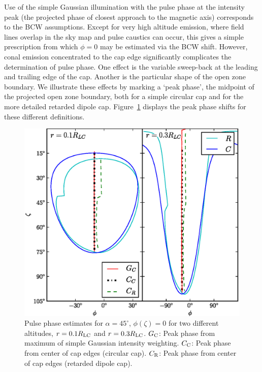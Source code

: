 	Use of the simple Gaussian illumination with the pulse phase at the
intensity peak (the projected phase of closest approach to the magnetic axis)
corresponds to the BCW assumptions. Except for very high altitude emission, where
field lines overlap in the sky map and pulse caustics can occur, this gives
a simple prescription from which $\phi=0$ may be estimated via the BCW shift. 
However, conal emission concentrated to the cap edge significantly complicates
the determination of pulse phase. One effect is the variable sweep-back at the
leading and trailing edge of the cap. Another is the particular shape of the open
zone boundary. We illustrate these effects by marking a `peak phase', the
midpoint of the projected open zone boundary, both for a simple circular cap and
for the more detailed retarded dipole cap.  Figure~\ref{fig:Plotcap} displays 
the peak phase shifts for these different definitions.

\begin{figure}[t!!]
\begin{center}
\includegraphics[width=1\textwidth]{chapters/BCWlimitations/figures/imageCaps.eps}
\caption[Pulse phase estimates for $\alpha=45^\circ$, $\phi(\zeta) = 0$
for two different altitudes, $r=0.1R_{\rm{LC}}$ and $r=0.3R_{\rm{LC}}$]{Pulse phase estimates for $\alpha=45^\circ$, $\phi(\zeta) = 0$ 
for two different altitudes, $r=0.1R_{\rm{LC}}$ and $r=0.3R_{\rm{LC}}$.
$G_{\rm{C}}$: Peak phase from maximum of simple Gaussian intensity weighting.
$C_{\rm{C}}$: Peak phase from center of cap edges (circular cap).
$C_{\rm{R}}$: Peak phase from center of cap edges (retarded dipole cap).}
\label{fig:Plotcap}
\end{center}
\end{figure}

